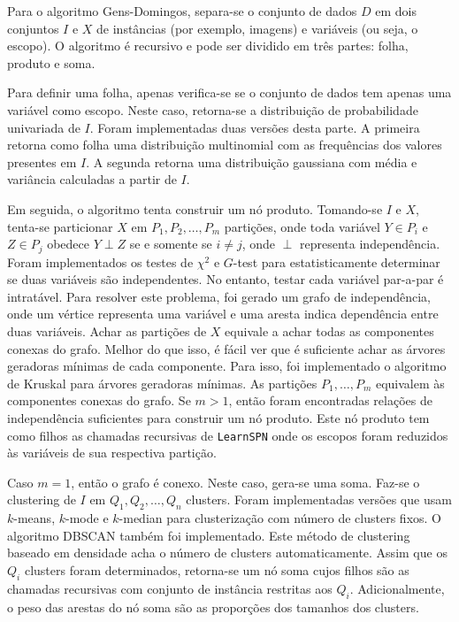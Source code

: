 \documentclass[12pt]{article}
\theoremstyle{plain}
\numberwithin{equation}{section}
\newcommand{\indep}{\perp}
\newcommand{\code}[1]{\lstinline[mathescape=true]{#1}}
\begin{document}
Para o algoritmo Gens-Domingos, separa-se o conjunto de dados $D$ em dois conjuntos $I$ e $X$ de
instâncias (por exemplo, imagens) e variáveis (ou seja, o escopo). O algoritmo é recursivo e pode
ser dividido em três partes: folha, produto e soma.

Para definir uma folha, apenas verifica-se se o conjunto de dados tem apenas uma variável como
escopo. Neste caso, retorna-se a distribuição de probabilidade univariada de $I$. Foram
implementadas duas versões desta parte. A primeira retorna como folha uma distribuição multinomial
com as frequências dos valores presentes em $I$. A segunda retorna uma distribuição gaussiana com
média e variância calculadas a partir de $I$.

Em seguida, o algoritmo tenta construir um nó produto. Tomando-se $I$ e $X$, tenta-se particionar
$X$ em $P_1,P_2,\ldots,P_m$ partições, onde toda variável $Y\in P_i$ e $Z\in P_j$ obedece $Y\indep
Z$ se e somente se $i\neq j$, onde $\indep$ representa independência. Foram implementados os testes
de $\chi^2$ e $G$-test para estatisticamente determinar se duas variáveis são independentes. No
entanto, testar cada variável par-a-par é intratável. Para resolver este problema, foi gerado um
grafo de independência, onde um vértice representa uma variável e uma aresta indica dependência
entre duas variáveis. Achar as partições de $X$ equivale a achar todas as componentes conexas do
grafo. Melhor do que isso, é fácil ver que é suficiente achar as árvores geradoras mínimas de cada
componente. Para isso, foi implementado o algoritmo de Kruskal para árvores geradoras mínimas.
As partições $P_1,\ldots,P_m$ equivalem às componentes conexas do grafo. Se $m>1$, então foram
encontradas relações de independência suficientes para construir um nó produto. Este nó produto tem
como filhos as chamadas recursivas de \code{LearnSPN} onde os escopos foram reduzidos às variáveis
de sua respectiva partição.

Caso $m=1$, então o grafo é conexo. Neste caso, gera-se uma soma. Faz-se o clustering de $I$ em
$Q_1,Q_2,\ldots,Q_n$ clusters. Foram implementadas versões que usam $k$-means, $k$-mode e
$k$-median para clusterização com número de clusters fixos. O algoritmo DBSCAN também foi
implementado. Este método de clustering baseado em densidade acha o número de clusters
automaticamente. Assim que os $Q_i$ clusters foram determinados, retorna-se um nó soma cujos filhos
são as chamadas recursivas com conjunto de instância restritas aos $Q_i$. Adicionalmente, o peso
das arestas do nó soma são as proporções dos tamanhos dos clusters.
\end{document}
